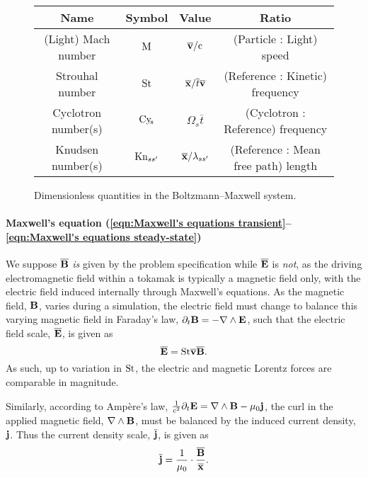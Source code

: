     \begin{figure}
        \centering
        \begin{tabular}{ c c c c }
            Name  &  Symbol  &  Value  &  Ratio  \\
            \hline\hline
            (Light) Mach number  &  $\mathrm{M}$  &  $\overline{\mathbf{v}}/\mathrm{c}$  &  (Particle : Light) speed  \\
            Strouhal number  &  $\mathrm{St}$  &  $\overline{\mathbf{x}}/\overline{t}\overline{\mathbf{v}}$  &  (Reference : Kinetic) frequency  \\
            Cyclotron number(s)  &  $\mathrm{Cy}\!_{s}$  &  $\Omega_{s}\overline{t}$  &  (Cyclotron : Reference) frequency  \\
            Knudsen number(s)  &  $\mathrm{Kn}_{ss'}$  &  $\overline{\mathbf{x}}/\lambda_{ss'}$  &  (Reference : Mean free path) length
        \end{tabular}
        \caption{Dimensionless quantities in the Boltzmann--Maxwell system.}
        \label{fig:kinetic dimensionless quantities}
    \end{figure} 

    \shortline

    \paragraph*{Maxwell's equation (\ref{eqn:Maxwell's equations transient}--\ref{eqn:Maxwell's equations steady-state})} We suppose $\overline{\mathbf{B}}$ \emph{is} given by the problem specification while $\overline{\mathbf{E}}$ is \emph{not}, as the driving electromagnetic field within a tokamak is typically a magnetic field only, with the electric field induced internally through Maxwell's equations. As the magnetic field, $\mathbf{B}$, varies during a simulation, the electric field must change to balance this varying magnetic field in Faraday's law, $\partial_{t}\mathbf{B}  =  - \nabla\wedge\mathbf{E}$, such that the electric field scale, $\overline{\mathbf{E}}$, is given as
    \begin{equation}
        \overline{\mathbf{E}}  =  \mathrm{St}\overline{\mathbf{v}}\overline{\mathbf{B}}.
    \end{equation}
    As such, up to variation in $\mathrm{St}$, the electric and magnetic Lorentz forces are comparable in magnitude.

    Similarly, according to Ampère's law, $\frac{1}{\mathrm{c}^{2}}\partial_{t}\mathbf{E}  =  \nabla\wedge\mathbf{B} - \mu_{0}\mathbf{j}$, the curl in the applied magnetic field, $\nabla\wedge\mathbf{B}$, must be balanced by the induced current density, $\mathbf{j}$. Thus the current density scale, $\overline{\mathbf{j}}$, is given as
    \begin{equation}
        \overline{\mathbf{j}}  =  \frac{1}{\mu_{0}}\cdot\frac{\overline{\mathbf{B}}}{\overline{\mathbf{x}}}.
    \end{equation}

